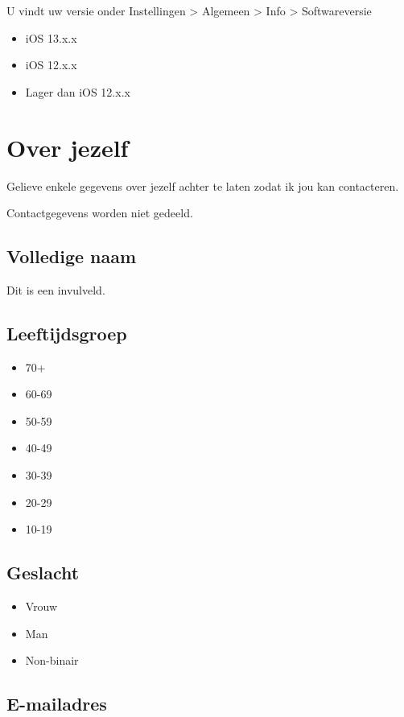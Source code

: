 U vindt uw versie onder Instellingen > Algemeen > Info > Softwareversie

\begin{itemize}
    \item iOS 13.x.x
    \item iOS 12.x.x
    \item Lager dan iOS 12.x.x
\end{itemize}

\section{Over jezelf}
\label{sec:contactgegevens}

Gelieve enkele gegevens over jezelf achter te laten zodat ik jou kan contacteren.

Contactgegevens worden niet gedeeld.

\subsection*{Volledige naam}

Dit is een invulveld.

\subsection*{Leeftijdsgroep}

\begin{itemize}
    \item 70+
    \item 60-69
    \item 50-59
    \item 40-49
    \item 30-39
    \item 20-29
    \item 10-19
\end{itemize}

\subsection*{Geslacht}

\begin{itemize}
    \item Vrouw
    \item Man
    \item Non-binair
\end{itemize}

\subsection*{E-mailadres}

